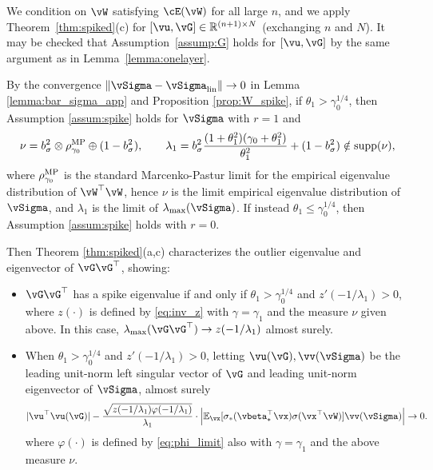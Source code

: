 \begin{proof-of-theorem}[\ref{thm:gd_spike}]
We condition on $\vW$ satisfying $\cE(\vW)$ for all large $n$, and we
apply Theorem~\ref{thm:spiked}(c) for $[\vu,\vG] \in \R^{(n+1)\times N}$
(exchanging $n$ and $N$). It may be checked that
Assumption~\ref{assump:G} holds for $[\vu,\vG]$ by the same argument as
in Lemma~\ref{lemma:onelayer}.

By the convergence $\|\vSigma-\vSigma_{\mathrm{lin}}\| \to 0$ in
Lemma \ref{lemma:bar_sigma_app} and Proposition \ref{prop:W_spike},
if $\theta_1>\gamma_0^{1/4}$, then
Assumption \ref{assum:spike} holds for $\vSigma$ with $r=1$ and
\[\nu=b_\sigma^2\otimes\rho^{\textnormal{MP}}_{\gamma_0}\oplus(1-b_\sigma^2), \qquad
\lambda_1=b_\sigma^2\frac{(1+\theta_1^2)(\gamma_0+\theta_1^2)}{\theta_1^2}
+(1-b_\sigma^2) \notin \mathrm{supp}({\nu}),\]
where $\rho_{\gamma_0}^{\textnormal{MP}}$ is the standard Marcenko-Pastur limit
for the empirical eigenvalue distribution of $\vW^\top \vW$, hence $\nu$ is
the limit empirical eigenvalue distribution of $\vSigma$, and $\lambda_1$ is the
limit of $\lambda_{\max}(\vSigma)$. If instead $\theta_1 \leq \gamma_0^{1/4}$,
then Assumption \ref{assum:spike} holds with $r=0$.

Then Theorem \ref{thm:spiked}(a,c)
characterizes the outlier eigenvalue and eigenvector of $\vG\vG^\top$, showing:
\begin{itemize}
	\item $\vG\vG^\top$ has a spike eigenvalue if and only if
$\theta_1>\gamma_0^{1/4}$ and $z'(-1/\lambda_1)>0$, where $z(\cdot)$ is defined 
by \eqref{eq:inv_z} with $\gamma=\gamma_1$ and the measure $\nu$ given above.
In this case, $\lambda_{\max}(\vG\vG^\top)\to z(-1/\lambda_1)$ almost surely.
	\item When $\theta_1>\gamma_0^{1/4}$ and $z'(-1/\lambda_1)>0$,
letting $\vu(\vG),\vv(\vSigma)$ be the leading unit-norm left singular vector
	of $\vG$ and leading unit-norm eigenvector of $\vSigma$, almost surely
			\[|\vu^\top \vu(\vG)|-
	\frac{\sqrt{z(-1/\lambda_1)\varphi({-}1/\lambda_1)}}{\lambda_1}
	\cdot\left|\E_{\vx}[\sigma_*(\vbeta_*^\top\vx)\sigma(\vx^\top\vW)]\vv(\vSigma)
	\right| \to 0.\]
where $\varphi(\cdot)$ is defined by \eqref{eq:phi_limit} also
with $\gamma=\gamma_1$ and the above measure $\nu$.
\end{itemize}


\end{proof-of-theorem}
